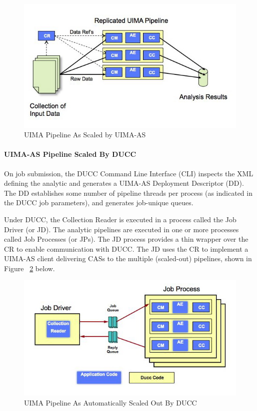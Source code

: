     \begin{figure}[H]
      \centering
      \includegraphics[bb=0 0 584 341, width=5.5in]{images/uima-as-pipeline.jpg}
      \caption{UIMA Pipeline As Scaled by UIMA-AS}
      \label{UIMA-AS-pipeline}
    \end{figure}

    \paragraph{UIMA-AS Pipeline Scaled By DUCC}
    On job submission, the DUCC Command Line Interface (CLI) inspects the XML defining the analytic
    and generates a UIMA-AS Deployment Descriptor (DD).  The DD establishes some number of pipeline
    threads per process (as indicated in the DUCC job parameters), and generates job-unique queues.

    Under DUCC, the Collection Reader is executed in a process called the Job Driver (or JD). The 
    analytic pipelines are executed in one or more processes called Job Processes (or JPs). The JD 
    process provides a thin wrapper over the CR to enable communication with DUCC.  The JD uses the
    CR to implement a UIMA-AS client delivering CASs to the multiple (scaled-out) pipelines, 
    shown in Figure     ~\ref{UIMA-AS-pipeline-DUCC} below.

    \begin{figure}[H]
      \centering
      \includegraphics[bb=0 0 571 311, width=5.5in]{images/ducc-sequential.jpg}
      \caption{UIMA Pipeline As Automatically Scaled Out By DUCC}
      \label{UIMA-AS-pipeline-DUCC}
    \end{figure}

